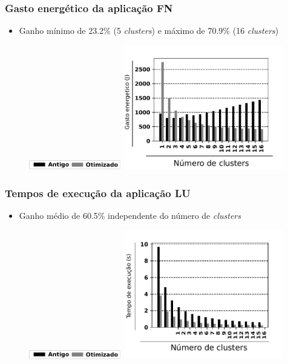 \documentclass[xcolor={table}]{beamer}
\begin{document}
\begin{frame}\frametitle{Gasto energético da aplicação FN}
\begin{itemize}
\item Ganho mínimo de 23.2\% (5 \textit{clusters}) e máximo de 70.9\% (16 \textit{clusters})
\end{itemize}
\begin{figure}
    \centering
    \includegraphics[width=4cm, keepaspectratio]{figs/legend.pdf}
    \includegraphics[width=7cm, keepaspectratio]{figs/fnpower.pdf}
    \label{fig:fig8}
\end{figure}
\end{frame}

\begin{frame}\frametitle{Tempos de execução da aplicação LU}
\begin{itemize}
\item Ganho médio de 60.5\% independente do número de \textit{clusters}
\end{itemize}
\begin{figure}
    \centering
    \includegraphics[width=4cm, keepaspectratio]{figs/legend.pdf}
    \includegraphics[width=7cm, keepaspectratio]{figs/lutime.pdf}
    \label{fig:fig9}
\end{figure}
\end{frame}
\end{document}

